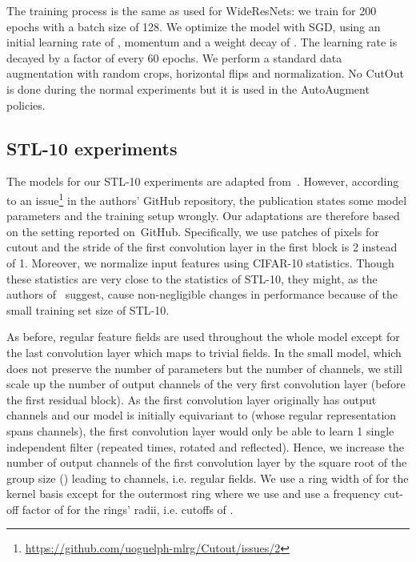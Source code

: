 \documentclass{article}
\begin{document}
{{The training process is the same as used for WideResNets: we train for 200 epochs with a batch size of 128. 
We optimize the model with SGD, using an initial learning rate of , momentum  and a weight decay of .
The learning rate is decayed by a factor of  every 60 epochs.
We perform a standard data augmentation with random crops, horizontal flips and normalization.
No CutOut is done during the normal experiments but it is used in the AutoAugment policies.



\subsection{STL-10 experiments}
\label{apx:stl10}

The models for our STL-10 experiments are adapted from~\cite{cutout}.
However, according to an issue\footnote{\url{https://github.com/uoguelph-mlrg/Cutout/issues/2}}
in the authors' GitHub repository, the publication states some model parameters and the training setup wrongly.
Our adaptations are therefore based on the setting reported on~GitHub.
Specifically, we use patches of  pixels for cutout and the stride of the first convolution layer in the first block is 2 instead of 1.
Moreover, we normalize input features using CIFAR-10 statistics.
Though these statistics are very close to the statistics of STL-10, they might, as the authors of~\cite{cutout} suggest, cause non-negligible changes in performance because of the small training set size of STL-10.

As before, regular feature fields are used throughout the whole model except for the last convolution layer which maps to trivial fields.
In the small model, which does not preserve the number of parameters but the number of channels, we still scale up the number of output channels of the very first convolution layer (before the first residual block).
As the first convolution layer originally has  output channels and our model is initially equivariant to  (whose regular representation spans  channels), the first convolution layer would only be able to learn 1 single independent filter (repeated  times, rotated and reflected).
Hence, we increase the number of output channels of the first convolution layer by the square root of the group size () leading to  channels, i.e.  regular fields.
We use a ring width of  for the kernel basis except for the outermost ring where we use  and use a frequency cut-off factor of  for the rings' radii, i.e. cutoffs of .

}}
\end{document}
